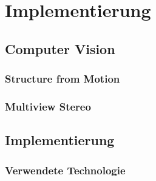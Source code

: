 \chapter{Implementierung}
	\section{Computer Vision}
		\subsection{Structure from Motion} \label{sfm}
		
		\subsection{Multiview Stereo} \label{mvs}
		
	\section{Implementierung}
		\subsection{Verwendete Technologie} \label{imp:tech}